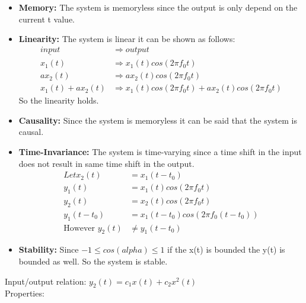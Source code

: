 \documentclass[letterpaper,12pt]{article}
\begin{document}
\begin{itemize}
    \item \textbf{Memory:} The system is memoryless since the output is only depend on the current t value.
    \item \textbf{Linearity:} The system is linear it can be shown as follows: \begin{equation}\begin{split}
        \underline{input} &\Rightarrow \underline{output} \\
        x_1(t)  & \Rightarrow x_1(t) cos(2\pi f_0 t) \\
        a x_2(t) & \Rightarrow  a x_2(t) cos(2\pi f_0 t) \\
        x_1(t) +  a x_2(t)  &\Rightarrow x_1(t) cos(2\pi f_0 t) + a x_2(t) cos(2\pi f_0 t)      \end{split}
    \end{equation} 
    So the linearity holds.
    \item \textbf{Causality:} Since the system is memoryless it can be said that the system is causal.
    \item \textbf{Time-Invariance:} The system is time-varying since a time shift in the input does not result in same time shift in the output. \begin{equation}
        \begin{split}
            Let x_2(t) &= x_1(t-t_0) \\
            y_1(t) &= x_1(t) cos(2 \pi f_0 t) \\ 
            y_2(t) &= x_2(t) cos(2 \pi f_0 t)\\
            y_1(t-t_0) &=    x_1(t-t_0) cos(2 \pi f_0 (t-t_0))\\
            \text{However  } y_2(t) & \neq y_1(t-t_0)
        \end{split}
    \end{equation}
    \item \textbf{Stability:} Since \(-1 \leq cos(alpha) \leq 1\) if the x(t) is bounded the y(t) is bounded as well. So the system is stable.
\end{itemize}
Input/output relation: \(y_2(t)= c_1 x(t) + c_2 x^2(t) \)
\\ Properties:
\end{document}
